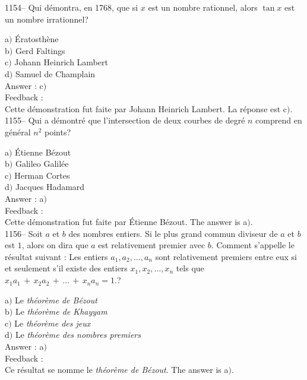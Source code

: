 ﻿\documentclass[letterpaper, 12pt]{article}
\begin{document}
1154-- Qui d\'emontra, en 1768, que si $x$ est un nombre rationnel,
alors $\tan x$ est un nombre irrationnel?

a$)$ \'Eratosth\`ene \\
b$)$ Gerd Faltings \\
c$)$ Johann Heinrich Lambert \\
d$)$ Samuel de Champlain\\

Answer : c$)$\\

Feedback : \\
Cette d\'emonstration fut faite par Johann Heinrich Lambert. La r\'eponse
est c$)$.\\

1155-- Qui a d\'emontr\'e que l'intersection de deux courbes de
degr\'e $n$ comprend en g\'en\'eral $n^2$ points?

a$)$ \'Etienne B\'ezout \\
b$)$ Galileo Galil\'ee \\
c$)$ Herman Cortes \\
d$)$ Jacques Hadamard\\

Answer : a$)$\\

Feedback : \\
Cette d\'emonstration fut faite par \'Etienne B\'ezout. The answer is
a$)$.\\

1156-- Soit $a$ et $b$ des nombres entiers. Si le plus grand commun
diviseur de $a$ et $b$ est $1$, alors on dira que $a$ est
relativement premier avec $b$. Comment s'appelle le r\'esultat
suivant : \og Les entiers $a_1,a_2,\ldots,a_n$ sont relativement
premiers entre eux si et seulement s'il existe des entiers
$x_1,x_2,\ldots,x_n$ tels que
$x_1a_1\,+\,x_2a_2\,+\,\ldots\,+\,x_na_n=1.$\fg ?

a$)$ Le {\sl th\'eor\`eme de B\'ezout} \\
b$)$ Le {\sl th\'eor\`eme de Khayyam} \\
c$)$ Le {\sl th\'eor\`eme des jeux} \\
d$)$ Le {\sl th\'eor\`eme des nombres premiers}\\

Answer : a$)$\\

Feedback : \\
Ce r\'esultat se nomme le {\sl th\'eor\`eme de B\'ezout}. The answer is
a$)$.\\
\end{document}
